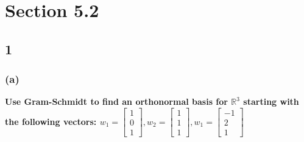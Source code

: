 \documentclass[10pt,letterpaper]{article}
\begin{document}
	\section*{Section 5.2}
	\subsection*{1}
	\subsubsection*{(a)} \textbf{Use Gram-Schmidt to find an orthonormal basis for $\mathbb{R}^3$ starting with the following vectors: $w_1 = \begin{bmatrix}
		1 \\ 0 \\ 1
		\end{bmatrix}, w_2 = \begin{bmatrix}
		1 \\ 1 \\ 1
		\end{bmatrix}, w_1 = \begin{bmatrix}
		-1 \\ 2 \\ 1
		\end{bmatrix}$}
	
\end{document}

